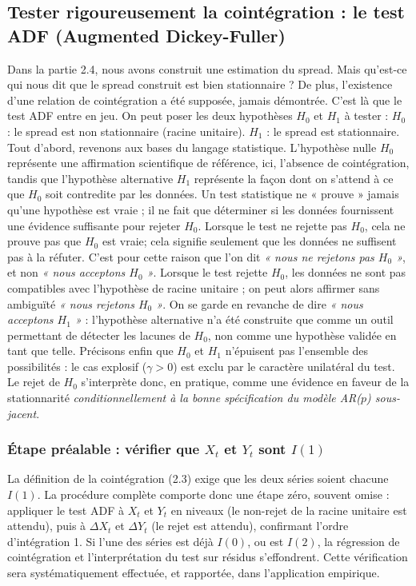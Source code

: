 \documentclass{article}
\begin{document}
\subsection{Tester rigoureusement la cointégration : le test ADF (Augmented Dickey-Fuller)}
Dans la partie 2.4, nous avons construit une estimation du spread. Mais qu'est-ce qui nous dit que le spread construit est bien stationnaire ? De plus, l'existence d'une relation de cointégration a été supposée, jamais démontrée. C'est là que le test ADF entre en jeu.
On peut poser les deux hypothèses $H_0$ et $H_1$ à tester :
$H_0$ : le spread est non stationnaire (racine unitaire).
$H_1$ : le spread est stationnaire. \\
Tout d'abord, revenons aux bases du langage statistique. L'hypothèse nulle $H_0$ représente une affirmation scientifique de référence, ici, l'absence de cointégration, tandis que l'hypothèse alternative $H_1$ représente la façon dont on s'attend à ce que $H_0$ soit contredite par les données. Un test statistique ne « prouve » jamais qu'une hypothèse est vraie ; il ne fait que déterminer si les données fournissent une évidence suffisante pour rejeter $H_0$.
Lorsque le test ne rejette pas $H_0$, cela ne prouve pas que $H_0$ est vraie; cela signifie seulement que les données ne suffisent pas à la réfuter. C'est pour cette raison que l'on dit \emph{« nous ne rejetons pas $H_0$ »}, et non \emph{« nous acceptons $H_0$ »}.
Lorsque le test rejette $H_0$, les données ne sont pas compatibles avec l'hypothèse de racine unitaire ; on peut alors affirmer sans ambiguïté \emph{« nous rejetons $H_0$ »}. On se garde en revanche de dire \emph{« nous acceptons $H_1$ »} : l'hypothèse alternative n'a été construite que comme un outil permettant de détecter les lacunes de $H_0$, non comme une hypothèse validée en tant que telle. Précisons enfin que $H_0$ et $H_1$ n'épuisent pas l'ensemble des possibilités : le cas explosif ($\gamma>0$) est exclu par le caractère unilatéral du test. Le rejet de $H_0$ s'interprète donc, en pratique, comme une évidence en faveur de la stationnarité \emph{conditionnellement à la bonne spécification du modèle AR($p$) sous-jacent}.

\subsubsection*{Étape préalable : vérifier que $X_t$ et $Y_t$ sont $I(1)$}
La définition de la cointégration (2.3) exige que les deux séries soient chacune $I(1)$. La procédure complète comporte donc une étape zéro, souvent omise : appliquer le test ADF à $X_t$ et $Y_t$ en niveaux (le non-rejet de la racine unitaire est attendu), puis à $\Delta X_t$ et $\Delta Y_t$ (le rejet est attendu), confirmant l'ordre d'intégration 1. Si l'une des séries est déjà $I(0)$, ou est $I(2)$, la régression de cointégration et l'interprétation du test sur résidus s'effondrent. Cette vérification sera systématiquement effectuée, et rapportée, dans l'application empirique.
\end{document}
